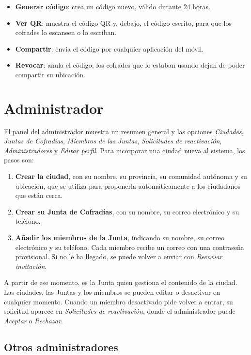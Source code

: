 \begin{itemize}
    \item \textbf{Generar código}: crea un código nuevo, válido durante 24 horas.
    \item \textbf{Ver QR}: muestra el código QR y, debajo, el código escrito, para que los cofrades lo escaneen o lo escriban.
    \item \textbf{Compartir}: envía el código por cualquier aplicación del móvil.
    \item \textbf{Revocar}: anula el código; los cofrades que lo estaban usando dejan de poder compartir su ubicación.
\end{itemize}

\section{Administrador}\label{sec:manualAdministrador}

El panel del administrador muestra un resumen general y las opciones \emph{Ciudades}, \emph{Juntas de Cofradías}, \emph{Miembros de las Juntas}, \emph{Solicitudes de reactivación}, \emph{Administradores} y \emph{Editar perfil}. Para incorporar una ciudad nueva al sistema, los pasos son:

\begin{enumerate}
    \item \textbf{Crear la ciudad}, con su nombre, su provincia, su comunidad autónoma y su ubicación, que se utiliza para proponerla automáticamente a los ciudadanos que están cerca.
    \item \textbf{Crear su Junta de Cofradías}, con su nombre, su correo electrónico y su teléfono.
    \item \textbf{Añadir los miembros de la Junta}, indicando su nombre, su correo electrónico y su teléfono. Cada miembro recibe un correo con una contraseña provisional. Si no le ha llegado, se puede volver a enviar con \emph{Reenviar invitación}.
\end{enumerate}

A partir de ese momento, es la Junta quien gestiona el contenido de la ciudad. Las ciudades, las Juntas y los miembros se pueden editar o desactivar en cualquier momento. Cuando un miembro desactivado pide volver a entrar, su solicitud aparece en \emph{Solicitudes de reactivación}, donde el administrador puede \emph{Aceptar} o \emph{Rechazar}.

\subsection{Otros administradores}

